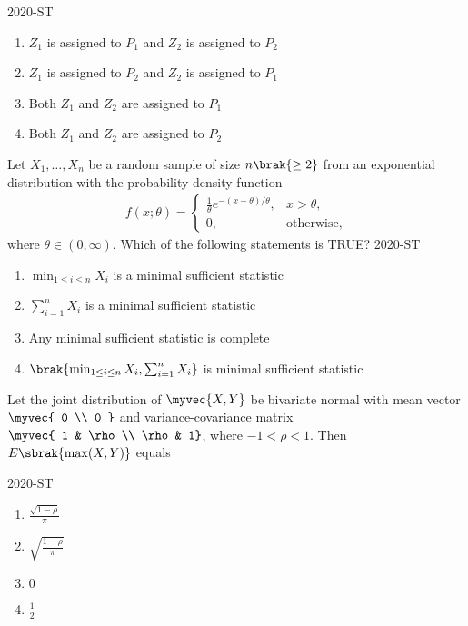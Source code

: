 \hfill{2020-ST}
\begin{enumerate}
    \item $Z_1$ is assigned to $P_1$ and $Z_2$ is assigned to $P_2$
    \item $Z_1$ is assigned to $P_2$ and $Z_2$ is assigned to $P_1$
    \item Both $Z_1$ and $Z_2$ are assigned to $P_1$
    \item Both $Z_1$ and $Z_2$ are assigned to $P_2$
\end{enumerate}

\item Let $X_1, \dots, X_n$ be a random sample of size $n \brak{\geq 2}$ from an exponential distribution with the probability density function
\begin{align*}
f(x; \theta) = \begin{cases} 
\frac{1}{\theta} e^{-(x - \theta)/\theta}, & x > \theta, \\
0, & \text{otherwise},
\end{cases}
\end{align*}
where $\theta \in (0, \infty)$. Which of the following statements is TRUE?
\hfill{2020-ST}
\begin{enumerate}
    \item $\min_{1 \leq i \leq n} X_i$ is a minimal sufficient statistic
    \item $\sum_{i=1}^n X_i$ is a minimal sufficient statistic
    \item Any minimal sufficient statistic is complete
    \item $\brak{ \min_{1 \leq i \leq n} X_i, \sum_{i=1}^n X_i}$ is minimal sufficient statistic
\end{enumerate}

\item Let the joint distribution of $\myvec{X, Y}$ be bivariate normal with mean vector $\myvec{ 0 \\ 0 }$ and variance-covariance matrix $\myvec{ 1 & \rho \\ \rho & 1}$, where $-1 < \rho < 1$. Then $E \sbrak{\max(X, Y)}$ equals

\hfill{2020-ST}
\begin{enumerate}
    \item $\frac{\sqrt{1 - \rho}}{\pi}$
    \item $\sqrt{\frac{1 - \rho}{\pi}}$
    \item $0$
    \item $\frac{1}{2}$
\end{enumerate}


